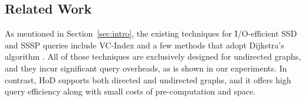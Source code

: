 \documentclass{sig-alternate}
\begin{document}
\begin{sloppy}





\section{Related Work} \label{sec:related}

As mentioned in Section~\ref{sec:intro}, the existing techniques for I/O-efficient SSD and SSSP queries include VC-Index \cite{ckcc12} and a few methods that adopt Dijkstra's algorithm \cite{mo09,mz03,mz12,m09,ks96}. All of those techniques are exclusively designed for undirected graphs, and they incur significant query overheads, as is shown in our experiments. In contrast, HoD supports both directed and undirected graphs, and it offers high query efficiency along with small costs of pre-computation and space.


\end{sloppy}
\end{document}
